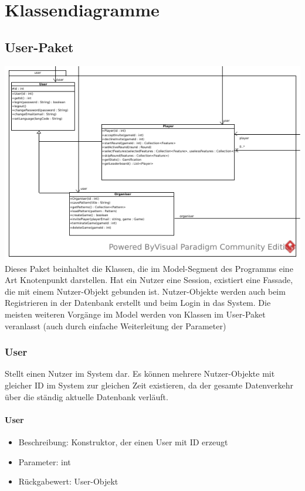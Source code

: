 \documentclass[a4paper]{scrreprt}
\begin{document}
	\chapter{Klassendiagramme}

	\section{User-Paket}
	\includegraphics[width=\textwidth]{img/package/user.pdf}
	Dieses Paket beinhaltet die Klassen, die im Model-Segment des Programms eine Art Knotenpunkt darstellen. Hat ein Nutzer eine Session, existiert
	eine Fassade, die mit einem Nutzer-Objekt gebunden ist. Nutzer-Objekte werden auch beim Registrieren in der Datenbank erstellt und beim Login
	in das System. Die meisten weiteren Vorgänge im Model werden von Klassen im User-Paket veranlasst (auch durch einfache Weiterleitung der Parameter)
	\subsection{User}
	Stellt einen Nutzer im System dar. Es können mehrere Nutzer-Objekte mit gleicher ID im System zur gleichen Zeit existieren, da der gesamte Datenverkehr über die ständig aktuelle Datenbank verläuft.
	\subsubsection{User}
	\begin{itemize}
		\item Beschreibung: Konstruktor, der einen User mit ID erzeugt
		\item Parameter: int
		\item Rückgabewert: User-Objekt
	\end{itemize}
\end{document}
